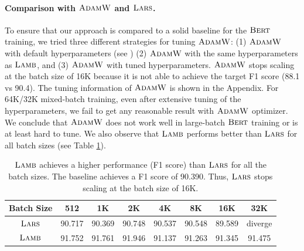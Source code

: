 \paragraph{Comparison with $\textsc{AdamW}$ and $\textsc{Lars}$.}
To ensure that our approach is compared to a solid baseline for the $\textsc{Bert}$ training, we tried three different strategies for tuning $\textsc{AdamW}$: (1) $\textsc{AdamW}$ with default hyperparameters (see \cite{devlin2018bert}) (2) $\textsc{AdamW}$ with the same hyperparameters as $\textsc{Lamb}$, and (3) $\textsc{AdamW}$ with tuned hyperparameters. $\textsc{AdamW}$ stops scaling at the batch size of 16K because it is not able to achieve the target F1 score (88.1 vs 90.4). 
The tuning information of $\textsc{AdamW}$ is shown in the Appendix.
For 64K/32K mixed-batch training, even after extensive tuning of the hyperparameters, we fail to get any reasonable result with $\textsc{AdamW}$ optimizer. 
We conclude that $\textsc{AdamW}$ does not work well in large-batch $\textsc{Bert}$ training or is at least hard to tune.
We also observe that $\textsc{Lamb}$ performs better than $\textsc{Lars}$ for all batch sizes (see Table \ref{table:lars_lamb_bert}).

\begin{table}[ht]
\renewcommand{\arraystretch}{1.3}
\caption{ $\textsc{Lamb}$ achieves a higher performance (F1 score) than $\textsc{Lars}$ for all the batch sizes. The baseline achieves a F1 score of 90.390. Thus, $\textsc{Lars}$ stops scaling at the batch size of 16K.}
\centering

\begin{tabular}{|c|c|c|c|c|c|c|c|}
\hline
Batch Size & 512 & 1K & 2K & 4K & 8K & 16K & 32K\\
\hline
\hline
$\textsc{Lars}$ & 90.717 & 90.369 & 90.748 & 90.537 & 90.548 & 89.589 & diverge \\
\hline
$\textsc{Lamb}$ & 91.752 & 91.761 & 91.946 & 91.137 & 91.263 & 91.345 & 91.475 \\
\hline
\end{tabular}
\label{table:lars_lamb_bert}
\end{table}


